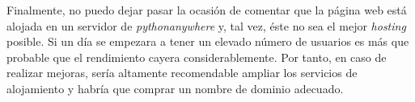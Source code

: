 Finalmente, no puedo dejar pasar la ocasión de comentar que la página web está alojada en un servidor de \emph{pythonanywhere} y, tal vez, éste no sea el mejor \emph{hosting}  posible. Si un día se empezara a tener un elevado número de usuarios es más que probable que el rendimiento cayera considerablemente. Por tanto, en caso de realizar mejoras, sería altamente recomendable ampliar los servicios de alojamiento y habría que comprar un nombre de dominio adecuado. 